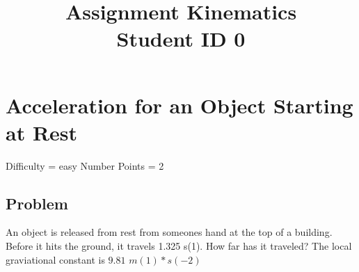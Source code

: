 \documentclass{article}
\title{Assignment Kinematics \\ Student ID 0}
\begin{document}
\maketitle

\section{Acceleration for an Object Starting at Rest}
Difficulty = easy
Number Points = 2
\subsection{Problem}
An object is released from rest from someones hand at the top of a building. Before it hits the ground, it travels 1.325 s(1). How far has it traveled? The local graviational constant is $9.81$ $m(1)*s(-2)$
\vspace{6cm} 
\end{document}

